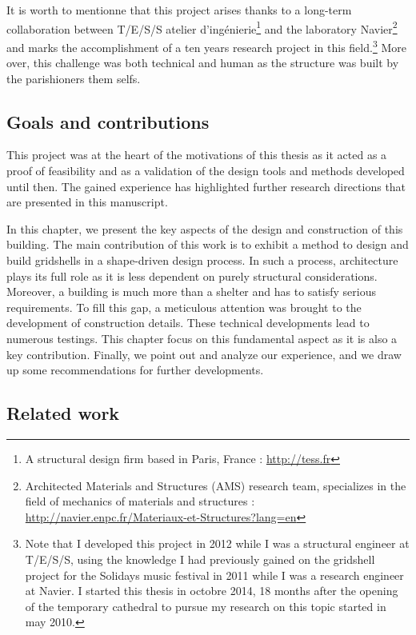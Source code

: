 It is worth to mentionne that this project arises thanks to a long-term collaboration between {T/E/S/S atelier d'ingénierie}\footnote{A structural design firm based in Paris, France : \url{http://tess.fr}} and the laboratory Navier\footnote{Architected Materials and Structures (AMS) research team, specializes in the field of mechanics of materials and structures : \url{http://navier.enpc.fr/Materiaux-et-Structures?lang=en}} and marks the accomplishment of a ten years research project in this field.\footnote{Note that I developed this project in 2012 while I was a structural engineer at T/E/S/S, using the knowledge I had previously gained on the gridshell project for the Solidays music festival in 2011 while I was a research engineer at Navier. I started this thesis in octobre 2014, 18 months after the opening of the temporary cathedral to pursue my research on this topic started in may 2010.} More over, this challenge was both technical and human as the structure was built by the parishioners them selfs.

\subsection{Goals and contributions}

This project was at the heart of the motivations of this thesis as it acted as a proof of feasibility and as a validation of the design tools and methods developed until then. The gained experience has highlighted further research directions that are presented in this manuscript.

In this chapter, we present the key aspects of the design and construction of this building. The main contribution of this work is to exhibit a method to design and build gridshells in a shape-driven design process. In such a process, architecture plays its full role as it is less dependent on purely structural considerations. Moreover, a building is much more than a shelter and has to satisfy serious requirements. To fill this gap, a meticulous attention was brought to the development of construction details. These technical developments lead to numerous testings. This chapter focus on this fundamental aspect as it is also a key contribution. Finally, we point out and analyze our experience, and we draw up some recommendations for further developments.

\subsection{Related work}

